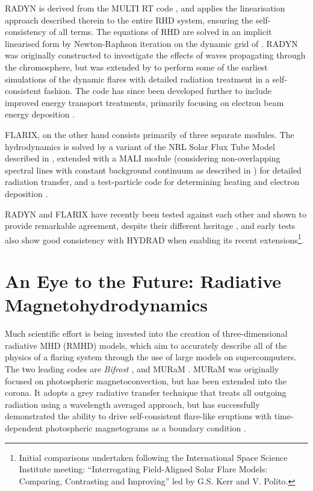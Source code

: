 RADYN is derived from the MULTI RT code \citep{Scharmer1985, Carlsson1986, Carlsson1992}, and applies the linearisation approach described therein to the entire RHD system, ensuring the self-consistency of all terms. The equations of RHD are solved in an implicit linearised form by Newton-Raphson iteration on the dynamic grid of \citet{Dorfi1987}.
RADYN was originally constructed to investigate the effects of waves propagating through the chromosphere, but was extended by \citet{Abbett1999} to perform some of the earliest simulations of the dynamic flares with detailed radiation treatment in a self-consistent fashion. The code has since been developed further to include improved energy transport treatments, primarily focusing on electron beam energy deposition \citep{Allred2005, Allred2015}.


FLARIX, on the other hand consists primarily of three separate modules. The hydrodynamics is solved by a variant of the NRL Solar Flux Tube Model described in \citet{Mariska1982,Mariska1989}, extended with a MALI module (considering non-overlapping spectral lines with constant background continuum as described in \citet{Rybicki1991}) for detailed radiation transfer, and a test-particle code for determining heating and electron deposition \citep{Varady2010, Heinzel2015}.

RADYN and FLARIX have recently been tested against each other and shown to provide remarkable agreement, despite their different heritage \citep{Kasparova2019}, and early tests also show good consistency with HYDRAD when enabling its recent extensions\footnote{Initial comparisons undertaken following the International Space Science Institute meeting: ``Interrogating Field-Aligned Solar Flare Models: Comparing, Contrasting and Improving'' led by G.S. Kerr and V. Polito.}.

\section{An Eye to the Future: Radiative Magnetohydrodynamics}

Much scientific effort is being invested into the creation of three-dimensional radiative MHD (RMHD) models, which aim to accurately describe all of the physics of a flaring system through the use of large models on supercomputers. The two leading codes are \textit{Bifrost} \citep{Gudiksen2011}, and MURaM \citep{Rempel2009,Rempel2016}. MURaM was originally focused on photospheric magnetoconvection, but has been extended into the corona. It adopts a grey radiative transfer technique that treats all outgoing radiation using a wavelength averaged approach, but has successfully demonstrated the ability to drive self-consistent flare-like eruptions with time-dependent photospheric magnetograms as a boundary condition \citep{Cheung2019}.

